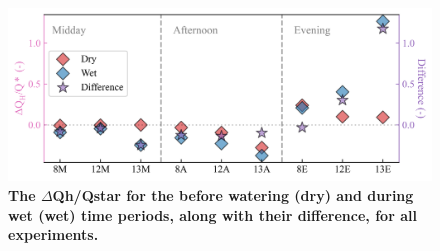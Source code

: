 \documentclass[final,3p,times,authoryear]{elsarticle}
\newcommand{\beginsupplement}{%
        \setcounter{table}{0}
        \renewcommand{\thetable}{S\arabic{table}}%
        \setcounter{figure}{0}
        \renewcommand{\thefigure}{S\arabic{figure}}%
     }
\begin{document}

\begin{figure}
\centering
\includegraphics[trim={0 0 0 0},clip,scale=0.9]{seb_qh_q.png}
\caption{\bf The $\Delta$\gls{Qh}/\gls{Qstar} for the before watering (dry) and during wet (wet) time periods, along with their difference, for all experiments.}
 \label{fig:7.19}
\end{figure}


\end{document}
